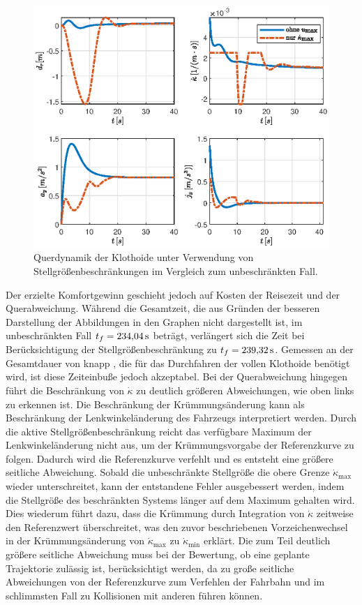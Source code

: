 \begin{figure}[h] 
	\centering
	\includegraphics[width=\linewidth]{./Bilder/Ergebnisse/Klothoide/nur_dkappa_max/lat_dyn.eps}
	\caption{Querdynamik der Klothoide unter Verwendung von Stellgrößenbeschränkungen im Vergleich zum unbeschränkten Fall.}
	\label{fig:lat_dyn_klothoide_umax}
\end{figure} 
Der erzielte Komfortgewinn geschieht jedoch auf Kosten der Reisezeit und der Querabweichung. Während die Gesamtzeit, die aus Gründen der besseren Darstellung der Abbildungen in den Graphen nicht dargestellt ist, im unbeschränkten Fall $t_f = 234{,}04\,\mathrm{s}$ beträgt, verlängert sich die Zeit bei Berücksichtigung der Stellgrößenbeschränkung zu $t_f = 239{,}32\,\mathrm{s}$. Gemessen an der Gesamtdauer von knapp , die für das Durchfahren der vollen Klothoide benötigt wird, ist diese Zeiteinbuße jedoch akzeptabel. Bei der Querabweichung hingegen führt die Beschränkung von $\dot{\kappa}$ zu deutlich größeren Abweichungen, wie oben links zu erkennen ist. Die Beschränkung der Krümmungsänderung kann als Beschränkung der Lenkwinkeländerung des Fahrzeugs interpretiert werden. Durch die aktive Stellgrößenbeschränkung reicht das verfügbare Maximum der Lenkwinkeländerung nicht aus, um der Krümmungsvorgabe der Referenzkurve zu folgen. Dadurch wird die Referenzkurve verfehlt und es entsteht eine größere seitliche Abweichung. Sobald die unbeschränkte Stellgröße die obere Grenze $\dot{\kappa}_{\textrm{max}}$ wieder unterschreitet, kann der entstandene Fehler ausgebessert werden, indem die Stellgröße des beschränkten Systems länger auf dem Maximum gehalten wird. Dies wiederum führt dazu, dass die Krümmung durch Integration von $\dot{\kappa}$ zeitweise den Referenzwert überschreitet, was den zuvor beschriebenen Vorzeichenwechsel in der Krümmungsänderung von $\dot{\kappa}_{\textrm{max}}$ zu $\dot{\kappa}_{\textrm{min}}$ erklärt. Die zum Teil deutlich größere seitliche Abweichung muss bei der Bewertung, ob eine geplante Trajektorie zulässig ist, berücksichtigt werden, da zu große seitliche Abweichungen von der Referenzkurve zum Verfehlen der Fahrbahn und im schlimmsten Fall zu Kollisionen mit anderen  führen können.
